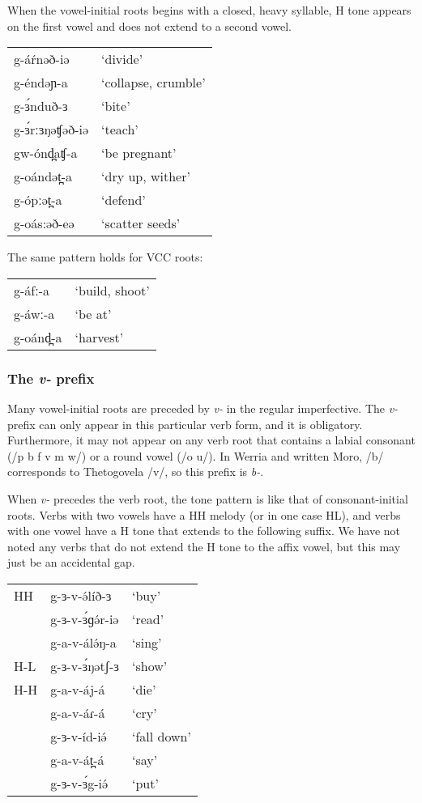 When the vowel-initial roots begins with a closed, heavy syllable, H tone appears on the first vowel and does not extend to a second vowel. 

\ea 
\begin{tabular}[t]{ll}
g-áŕnəð-iə	&	`divide'\\
g-éndəɲ-a	&	`collapse, crumble'\\
g-ɜ́nduð-ɜ	&	`bite'\\
g-ɜ́rːɜŋəʧəð-iə&	`teach'\\
gw-ónd̪aʧ-a	&	`be pregnant'\\
g-oándət̪-a	&	`dry up, wither'\\
g-ópːət̪-a	&	`defend'\\
g-oás:əð-eə	&	`scatter seeds'\\	
\end{tabular}
\z 

The same pattern holds for VCC roots:

\ea 
\begin{tabular}[t]{ll}
g-áfː-a	&	`build, shoot'\\
g-áwː-a	&	`be at'\\ %
g-oánd̪-a&	`harvest'\\	
\end{tabular}
\z 


\subsubsection{The \textit{v-} prefix}\label{sec:ch11:vprefix}

Many vowel-initial roots are preceded by \textit{v-} in the regular imperfective.  The \textit{v-} prefix can only appear in this particular verb form, and it is obligatory. Furthermore, it may not appear on any verb root that contains a labial consonant (/p b f v m w/) or a round vowel (/o u/). In Werria and written Moro, /b/ corresponds to Thetogovela /v/, so this prefix is \textit{b-}.

When \textit{v-} precedes the verb root, the tone pattern is like that of consonant-initial roots. Verbs with two vowels have a HH melody (or in one case HL), and verbs with one vowel have a H tone that extends to the following suffix. We have not noted any verbs that do not extend the H tone to the affix vowel, but this may just be an accidental gap. 

\ea 	
\begin{tabular}[t]{lll}
HH 	&  	g-ɜ-v-ə́líð-ɜ		&	‘buy’\\
	&	g-ɜ-v-ɜ́ɡə́r-iə		&	‘read’\\
	&	g-a-v-álə́ŋ-a		&	‘sing’\\
H-L &	g-ɜ-v-ɜ́ŋətʃ-ɜ	&	`show'\\
H-H &	g-a-v-áj-á		&	‘die’\\
	&	g-a-v-áɾ-á		&	‘cry’\\
	&	g-ɜ-v-íd-iə́		&	‘fall down’\\
	&	g-a-v-át̪-á		&	`say'\\
	&	g-ɜ-v-ɜ́g-iə́		&	`put'\\ 	
\end{tabular}
\z 

